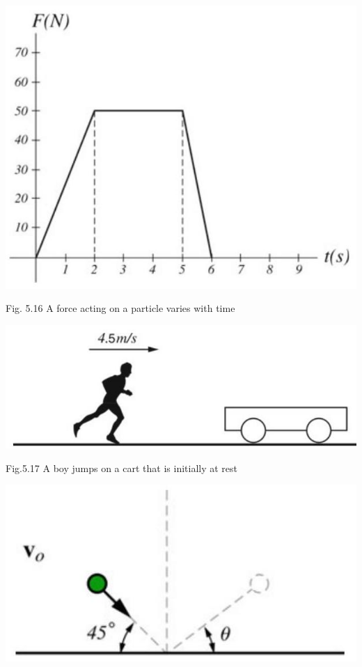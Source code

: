 \documentclass[10pt]{article}
\begin{document}
\begin{center}
\includegraphics[max width=\textwidth]{2024_09_13_db1f357d2aad0a03eb2eg-093}
\end{center}

Fig. 5.16 A force acting on a particle varies with time

\begin{center}
\includegraphics[max width=\textwidth]{2024_09_13_db1f357d2aad0a03eb2eg-093(1)}
\end{center}

Fig.5.17 A boy jumps on a cart that is initially at rest

\begin{center}
\includegraphics[max width=\textwidth]{2024_09_13_db1f357d2aad0a03eb2eg-093(6)}
\end{center}
\end{document}
